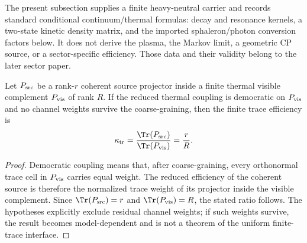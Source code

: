 \documentclass[12pt,a4paper]{article}
\begin{document}
\begin{remark}
\label{p4:rem:thermal-interface-status}
The present subsection supplies a finite heavy-neutral carrier and records
standard conditional continuum/thermal formulas: decay and resonance
kernels, a two-state kinetic density matrix, and the imported
sphaleron/photon conversion factors below.  It does not derive the plasma,
the Markov limit, a geometric CP source, or a sector-specific efficiency.
Those data and their validity belong to the later sector paper.
\end{remark}

\begin{lemma}
\label{p4:lem:uniform-finite-trace-efficiency}
Let \(P_{\rm src}\) be a rank-\(r\) coherent source projector inside a finite thermal visible complement \(P_{\rm vis}\) of rank \(R\).  If the reduced thermal coupling is democratic on \(P_{\rm vis}\) and no channel weights survive the coarse-graining, then the finite trace efficiency is
\[
\kappa_{\rm tr}
=
\frac{\Tr(P_{\rm src})}{\Tr(P_{\rm vis})}
=
\frac{r}{R}.
\]
\end{lemma}

\begin{proof}
Democratic coupling means that, after coarse-graining, every orthonormal trace cell in \(P_{\rm vis}\) carries equal weight.  The reduced efficiency of the coherent source is therefore the normalized trace weight of its projector inside the visible complement.  Since \(\Tr(P_{\rm src})=r\) and \(\Tr(P_{\rm vis})=R\), the stated ratio follows.  The hypotheses explicitly exclude residual channel weights; if such weights survive, the result becomes model-dependent and is not a theorem of the uniform finite-trace interface.
\end{proof}
\end{document}
